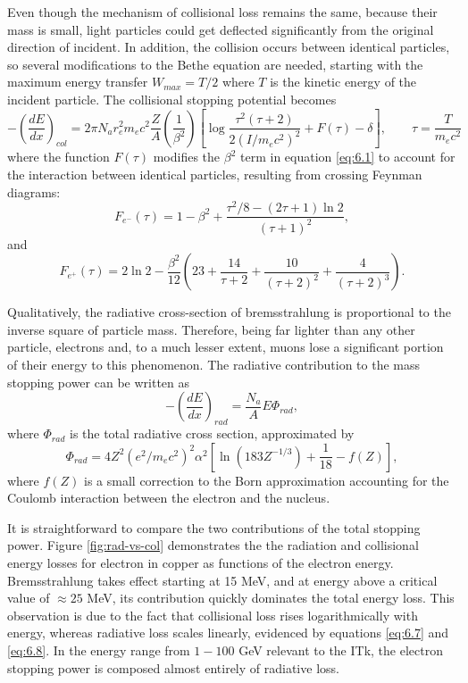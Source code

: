 Even though the mechanism of collisional loss remains the same, because their mass is small, light particles could get deflected significantly from the original direction of incident. 
In addition, the collision occurs between identical particles, so several modifications to the Bethe equation are needed, starting with the maximum energy transfer $W_{max} = T/2$ where $T$ is the kinetic energy of the incident particle. The collisional stopping potential becomes
\begin{equation}
    \label{eq:6.7}
    -\left( \frac{dE}{dx}\right)_{col} = 2\pi N_a r_e^2 m_e c^2 \frac{Z}{A} \left( \frac{1}{\beta^2} \right) \left[ \log \frac{\tau^2 (\tau +2)}{2(I/m_ec^2)^2} + F(\tau) -\delta \right], \quad \quad \tau = \frac{T}{m_e c^2}
\end{equation}
where the function $F(\tau)$ modifies the $\beta^2$ term in equation \eqref{eq:6.1} to account for the interaction between identical particles, resulting from crossing Feynman diagrams:
$$
    F_{e^-}(\tau) = 1-\beta^2 + \frac{\tau^2 / 8 - (2\tau +1)\ln 2}{(\tau +1 )^2},
$$
and 
$$
    F_{e^+}(\tau) = 2\ln 2 - \frac{\beta^2}{12}\left( 23 + \frac{14}{\tau+2} + \frac{10}{(\tau+2)^2} + \frac{4}{(\tau + 2)^3} \right).
$$

Qualitatively, the radiative cross-section of bremsstrahlung is proportional to the inverse square of particle mass. Therefore, being far lighter than any other particle, electrons and, to a much lesser extent, muons lose a significant portion of their energy to this phenomenon. The radiative contribution to the mass stopping power can be written as
\begin{equation}
    \label{eq:6.8}
    -\left( \frac{dE}{dx}\right)_{rad} = \frac{N_a}{A}E\Phi_{rad},
\end{equation}
where $\Phi_{rad}$ is the total radiative cross section, approximated by 
\begin{equation}
    \label{eq:6.9}
    \Phi_{rad} = 4Z^2(e^2/m_ec^2)^2\alpha^2 \left [ \ln (183Z^{-1/3} ) + \frac{1}{18} - f(Z) \right],
\end{equation}
where $f(Z)$ is a small correction to the Born approximation accounting for the Coulomb interaction between the electron and the nucleus. 

It is straightforward to compare the two contributions of the total stopping power. Figure \ref{fig:rad-vs-col} demonstrates the the radiation and collisional energy losses for electron in copper as functions of the electron energy. Bremsstrahlung takes effect starting at 15 MeV, and at energy above a critical value of $\approx 25$ MeV, its contribution quickly dominates the total energy loss. This observation is due to the fact that collisional loss rises logarithmically with energy, whereas radiative loss scales linearly, evidenced by equations \eqref{eq:6.7} and \eqref{eq:6.8}. In the energy range from $1-100$ GeV relevant to the ITk, the electron stopping power is composed almost entirely of radiative loss. 


